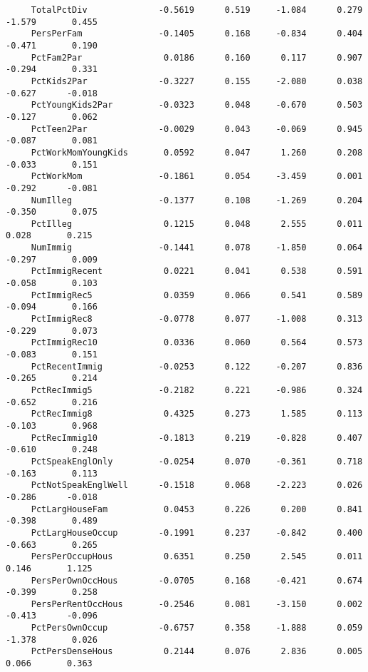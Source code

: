 \documentclass[letterpaper]{article}
\begin{document}
\begin{minipage}{\linewidth}
\begin{Verbatim}
     TotalPctDiv              -0.5619      0.519     -1.084      0.279      -1.579       0.455
     PersPerFam               -0.1405      0.168     -0.834      0.404      -0.471       0.190
     PctFam2Par                0.0186      0.160      0.117      0.907      -0.294       0.331
     PctKids2Par              -0.3227      0.155     -2.080      0.038      -0.627      -0.018
     PctYoungKids2Par         -0.0323      0.048     -0.670      0.503      -0.127       0.062
     PctTeen2Par              -0.0029      0.043     -0.069      0.945      -0.087       0.081
     PctWorkMomYoungKids       0.0592      0.047      1.260      0.208      -0.033       0.151
     PctWorkMom               -0.1861      0.054     -3.459      0.001      -0.292      -0.081
     NumIlleg                 -0.1377      0.108     -1.269      0.204      -0.350       0.075
     PctIlleg                  0.1215      0.048      2.555      0.011       0.028       0.215
     NumImmig                 -0.1441      0.078     -1.850      0.064      -0.297       0.009
     PctImmigRecent            0.0221      0.041      0.538      0.591      -0.058       0.103
     PctImmigRec5              0.0359      0.066      0.541      0.589      -0.094       0.166
     PctImmigRec8             -0.0778      0.077     -1.008      0.313      -0.229       0.073
     PctImmigRec10             0.0336      0.060      0.564      0.573      -0.083       0.151
     PctRecentImmig           -0.0253      0.122     -0.207      0.836      -0.265       0.214
     PctRecImmig5             -0.2182      0.221     -0.986      0.324      -0.652       0.216
     PctRecImmig8              0.4325      0.273      1.585      0.113      -0.103       0.968
     PctRecImmig10            -0.1813      0.219     -0.828      0.407      -0.610       0.248
     PctSpeakEnglOnly         -0.0254      0.070     -0.361      0.718      -0.163       0.113
     PctNotSpeakEnglWell      -0.1518      0.068     -2.223      0.026      -0.286      -0.018
     PctLargHouseFam           0.0453      0.226      0.200      0.841      -0.398       0.489
     PctLargHouseOccup        -0.1991      0.237     -0.842      0.400      -0.663       0.265
     PersPerOccupHous          0.6351      0.250      2.545      0.011       0.146       1.125
     PersPerOwnOccHous        -0.0705      0.168     -0.421      0.674      -0.399       0.258
     PersPerRentOccHous       -0.2546      0.081     -3.150      0.002      -0.413      -0.096
     PctPersOwnOccup          -0.6757      0.358     -1.888      0.059      -1.378       0.026
     PctPersDenseHous          0.2144      0.076      2.836      0.005       0.066       0.363

\end{Verbatim}
\end{minipage}
\end{document}
